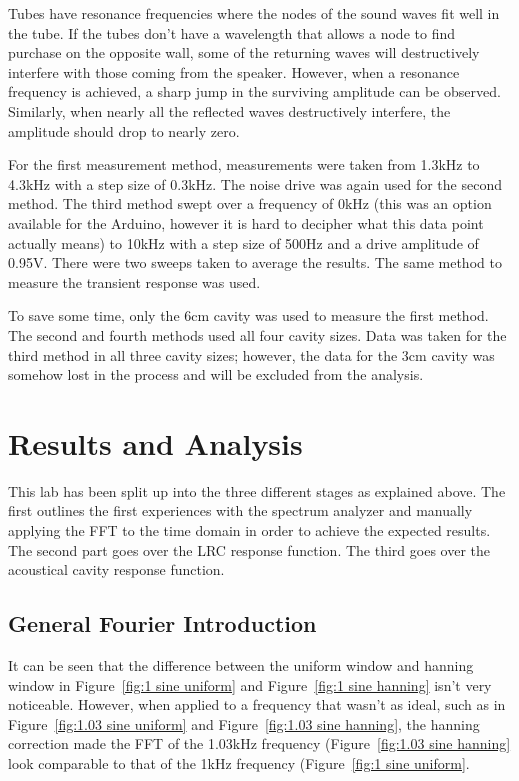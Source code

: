 \documentclass[12pt]{article}
\begin{document}
    Tubes have resonance frequencies where the nodes of the sound waves fit well in the tube. If the tubes don't have a wavelength that allows a node to find purchase on the opposite wall, some of the returning waves will destructively interfere with those coming from the speaker. However, when a resonance frequency is achieved, a sharp jump in the surviving amplitude can be observed. Similarly, when nearly all the reflected waves destructively interfere, the amplitude should drop to nearly zero. 
    
    For the first measurement method, measurements were taken from 1.3kHz to 4.3kHz with a step size of 0.3kHz. The noise drive was again used for the second method. The third method swept over a frequency of 0kHz (this was an option available for the Arduino, however it is hard to decipher what this data point actually means) to 10kHz with a step size of 500Hz and a drive amplitude of 0.95V. There were two sweeps taken to average the results. The same method to measure the transient response was used. 
    
    To save some time, only the 6cm cavity was used to measure the first method. The second and fourth methods used all four cavity sizes. Data was taken for the third method in all three cavity sizes; however, the data for the 3cm cavity was somehow lost in the process and will be excluded from the analysis.
    
    
    \section{Results and Analysis}
    
    This lab has been split up into the three different stages as explained above. The first outlines the first experiences with the spectrum analyzer and manually applying the FFT to the time domain in order to achieve the expected results. The second part goes over the LRC response function. The third goes over the acoustical cavity response function. 
    
    \subsection{General Fourier Introduction}
    It can be seen that the difference between the uniform window and hanning window in Figure~\ref{fig:1 sine uniform} and Figure~\ref{fig:1 sine hanning} isn't very noticeable. However, when applied to a frequency that wasn't as ideal, such as in Figure~\ref{fig:1.03 sine uniform} and Figure~\ref{fig:1.03 sine hanning}, the hanning correction made the FFT of the 1.03kHz frequency (Figure~\ref{fig:1.03 sine hanning} look comparable to that of the 1kHz frequency (Figure~\ref{fig:1 sine uniform}. 
    
\end{document}
